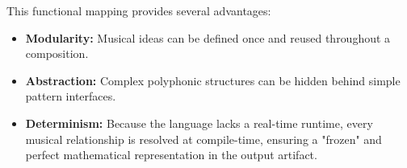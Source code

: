 This functional mapping provides several advantages:
\begin{itemize}
  \item \textbf{Modularity:} Musical ideas can be defined once and reused throughout a composition.
  \item \textbf{Abstraction:} Complex polyphonic structures can be hidden behind simple pattern interfaces.
  \item \textbf{Determinism:} Because the language lacks a real-time runtime, every musical relationship is
    resolved at compile-time, ensuring a "frozen" and perfect mathematical representation in the output artifact.
\end{itemize}
